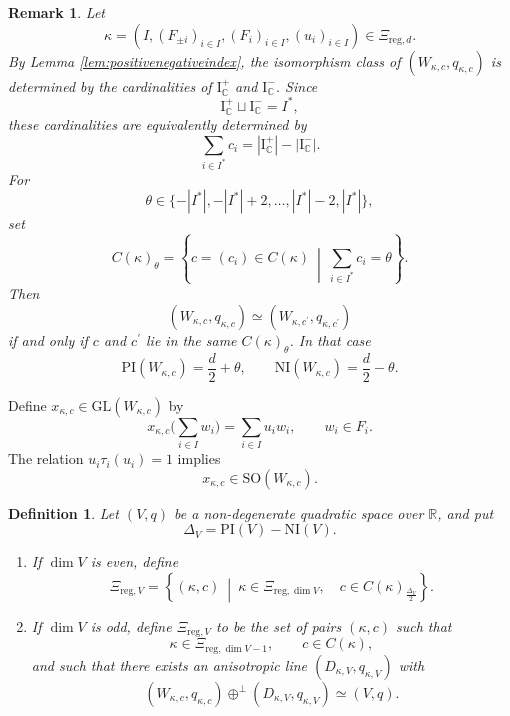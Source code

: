 \documentclass[12pt]{amsart}
\numberwithin{equation}{subsection}
\newcommand{\BC}{{\mathbb {C}}}
\newcommand{\BR}{{\mathbb {R}}}
\newcommand{\RI}{{\mathrm {I}}}
\newcommand{\GL}{{\mathrm{GL}}}
\newcommand{\reg}{{\mathrm{reg}}}
\newcommand{\SO}{{\mathrm{SO}}}
\def\Del{{\Delta}}
\def\p{\prime}
\def\PI{\mathrm{PI}}
\def\NI{\mathrm{NI}}
\def\SO{\mathrm{SO}}
\newtheorem{defin}[thm]{Definition}
\newtheorem{rmk}[thm]{Remark}
\begin{document}
\begin{rmk}\label{rmk:changeindextosign}
Let
\[
\kappa=(I,(F_{\pm i})_{i\in I},(F_i)_{i\in I},(u_i)_{i\in I})
\in \Xi_{\reg,d}.
\]
By Lemma \ref{lem:positivenegativeindex}, the isomorphism class of
$(W_{\kappa,c},q_{\kappa,c})$ is determined by the cardinalities of
$\RI_\BC^+$ and $\RI_\BC^-$. Since
\[
\RI_\BC^+\sqcup \RI_\BC^-=I^*,
\]
these cardinalities are equivalently determined by
\[
\sum_{i\in I^*}c_i=|\RI_\BC^+|-|\RI_\BC^-|.
\]
For
\[
\theta\in \{-|I^*|,-|I^*|+2,\ldots,|I^*|-2,|I^*|\},
\]
set
\[
C(\kappa)_\theta
=
\left\{
c=(c_i)\in C(\kappa)
\ \middle|\
\sum_{i\in I^*}c_i=\theta
\right\}.
\]
Then
\[
(W_{\kappa,c},q_{\kappa,c})
\simeq
(W_{\kappa,c^\p},q_{\kappa,c^\p})
\]
if and only if $c$ and $c^\p$ lie in the same $C(\kappa)_\theta$. In that case
\begin{equation}\label{eq:indexofWkappac}
\PI(W_{\kappa,c})=\frac{d}{2}+\theta,
\qquad
\NI(W_{\kappa,c})=\frac{d}{2}-\theta.
\end{equation}
\end{rmk}

Define $x_{\kappa,c}\in \GL(W_{\kappa,c})$ by
\begin{equation}\label{eq:quadkappac:2}
x_{\kappa,c}
\bigg(
\sum_{i\in I}w_i
\bigg)
=
\sum_{i\in I}u_iw_i,
\qquad w_i\in F_i.
\end{equation}
The relation $u_i\tau_i(u_i)=1$ implies
\[
x_{\kappa,c}\in \SO(W_{\kappa,c}).
\]

\begin{defin}\label{defin:parconj}
Let $(V,q)$ be a non-degenerate quadratic space over $\BR$, and put
\[
\Del_V=\PI(V)-\NI(V).
\]

\begin{enumerate}
\item
If $\dim V$ is even, define
\[
\Xi_{\reg,V}
=
\left\{
(\kappa,c)
\ \middle|\
\kappa\in \Xi_{\reg,\dim V},\quad
c\in C(\kappa)_{\frac{\Del_V}{2}}
\right\}.
\]

\item
If $\dim V$ is odd, define $\Xi_{\reg,V}$ to be the set of pairs
$(\kappa,c)$ such that
\[
\kappa\in \Xi_{\reg,\dim V-1},\qquad c\in C(\kappa),
\]
and such that there exists an anisotropic line $(D_{\kappa,V},q_{\kappa,V})$
with
\[
(W_{\kappa,c},q_{\kappa,c})
\oplus^\perp
(D_{\kappa,V},q_{\kappa,V})
\simeq
(V,q).
\]
\end{enumerate}
\end{defin}
\end{document}
